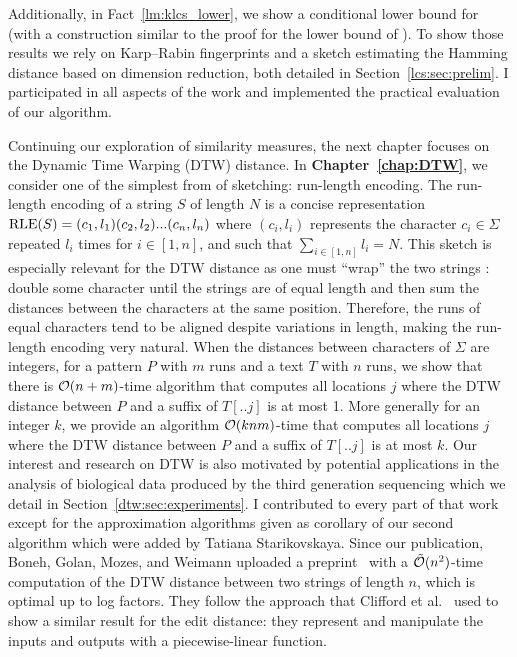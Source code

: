 Additionally, in Fact~\ref{lm:klcs_lower}, we show a conditional lower bound for \kApproxLCS (with a construction similar to the proof for the lower bound of \kLCS ).
To show those results we rely on Karp--Rabin fingerprints and a sketch estimating the Hamming distance based on dimension reduction, both detailed in Section~\ref{lcs:sec:prelim}.
I participated in all aspects of the work and implemented the practical evaluation of our algorithm.

Continuing our exploration of similarity measures, the next chapter focuses on the Dynamic Time Warping (DTW) distance.
In \textbf{Chapter~\ref{chap:DTW}}, we consider one of the simplest from of sketching: run-length encoding. The run-length encoding of a string $S$ of length $N$ is a concise representation $\mathrm{RLE}(S)=(c_1,l_1)(c_2,l_2)...(c_n,l_n)$ where $(c_i,l_i)$ represents the character $c_i \in \Sigma$ repeated $l_i$ times  for $i \in [1,n]$, and such that $\sum_{i\in [1,n]} l_i = N$.
This sketch is especially relevant for the DTW distance as one must ``wrap'' the two strings : double some character until the strings are of equal length and then sum the distances between the characters at the same position. Therefore, the runs of equal characters tend to be aligned despite variations in length, making the run-length encoding very natural.
When the distances between characters of $\Sigma$ are integers, for a pattern $P$ with $m$ runs and a text $T$ with $n$ runs, we show that there is $\mathcal{O}(n+m)$-time algorithm that computes all locations $j$ where the DTW distance between $P$ and a suffix of $T[..j]$ is at most 1. More generally for an integer $k$, we provide an algorithm $\mathcal{O}(knm)$-time that computes all locations $j$ where the DTW distance between $P$ and a suffix of $T[..j]$ is at most $k$.
Our interest and research on DTW is also motivated by potential applications in the analysis of biological data produced by the third generation sequencing which we detail in Section~\ref{dtw:sec:experiments}.
I contributed to every part of that work except for the approximation algorithms given as corollary of our second algorithm which were added by Tatiana Starikovskaya.
Since our publication, Boneh, Golan, Mozes, and Weimann uploaded a preprint~\cite{boneh2023near} with a $\tilde{\mathcal{O}}(n^2)$-time computation of the DTW distance between two strings of length $n$, which is optimal up to log factors. They follow the approach that Clifford et al.~\cite{clifford2019rle} used to show a similar result for the edit distance: they represent and manipulate the inputs and outputs with a piecewise-linear function.

